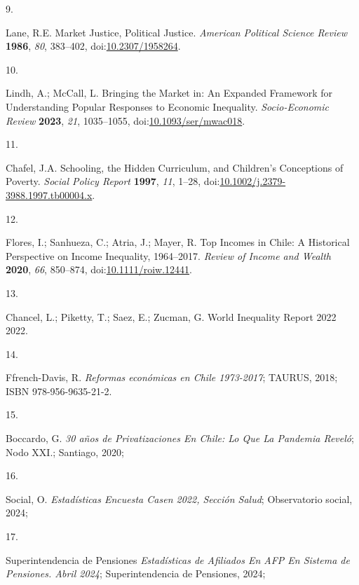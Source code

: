 \documentclass[
  12pt,
  letterpaper,
]{article}
\newlength{\cslhangindent}
\newlength{\csllabelwidth}
\newenvironment{CSLReferences}[2] %
 {\begin{list}{}{%
  \setlength{\itemindent}{0pt}
  \setlength{\leftmargin}{0pt}
  \setlength{\parsep}{0pt}
  \ifodd #1
   \setlength{\leftmargin}{\cslhangindent}
   \setlength{\itemindent}{-1\cslhangindent}
  \fi
  \setlength{\itemsep}{#2\baselineskip}}}
 {\end{list}}
\newcommand{\CSLLeftMargin}[1]{\parbox[t]{\csllabelwidth}{\strut#1\strut}}
\newcommand{\CSLRightInline}[1]{\parbox[t]{\linewidth - \csllabelwidth}{\strut#1\strut}}
\begin{document}
\begin{CSLReferences}{0}{0}
\CSLLeftMargin{9. }%
\CSLRightInline{Lane, R.E. Market {Justice}, {Political Justice}.
\emph{American Political Science Review} \textbf{1986}, \emph{80},
383--402, doi:\href{https://doi.org/10.2307/1958264}{10.2307/1958264}.}

\CSLLeftMargin{10. }%
\CSLRightInline{Lindh, A.; McCall, L. Bringing the Market in: An
Expanded Framework for Understanding Popular Responses to Economic
Inequality. \emph{Socio-Economic Review} \textbf{2023}, \emph{21},
1035--1055,
doi:\href{https://doi.org/10.1093/ser/mwac018}{10.1093/ser/mwac018}.}

\CSLLeftMargin{11. }%
\CSLRightInline{Chafel, J.A. Schooling, the {Hidden Curriculum}, and
{Children}'s {Conceptions} of {Poverty}. \emph{Social Policy Report}
\textbf{1997}, \emph{11}, 1--28,
doi:\href{https://doi.org/10.1002/j.2379-3988.1997.tb00004.x}{10.1002/j.2379-3988.1997.tb00004.x}.}

\CSLLeftMargin{12. }%
\CSLRightInline{Flores, I.; Sanhueza, C.; Atria, J.; Mayer, R. Top
{Incomes} in {Chile}: {A Historical Perspective} on {Income Inequality},
1964--2017. \emph{Review of Income and Wealth} \textbf{2020}, \emph{66},
850--874,
doi:\href{https://doi.org/10.1111/roiw.12441}{10.1111/roiw.12441}.}

\CSLLeftMargin{13. }%
\CSLRightInline{Chancel, L.; Piketty, T.; Saez, E.; Zucman, G. World
Inequality Report 2022 2022.}

\CSLLeftMargin{14. }%
\CSLRightInline{Ffrench-Davis, R. \emph{{Reformas econ{ó}micas en Chile
1973-2017}}; TAURUS, 2018; ISBN 978-956-9635-21-2.}

\CSLLeftMargin{15. }%
\CSLRightInline{Boccardo, G. \emph{30 a{ñ}os de Privatizaciones En
{Chile}: Lo Que La Pandemia Revel{ó}}; Nodo XXI.; Santiago, 2020;}

\CSLLeftMargin{16. }%
\CSLRightInline{Social, O. \emph{Estad{í}sticas {Encuesta Casen} 2022,
Secci{ó}n {Salud}}; Observatorio social, 2024;}

\CSLLeftMargin{17. }%
\CSLRightInline{Superintendencia de Pensiones \emph{Estad{í}sticas de
{Afiliados} En {AFP} En {Sistema} de {Pensiones}. {Abril} 2024};
Superintendencia de Pensiones, 2024;}


\end{CSLReferences}
\end{document}
